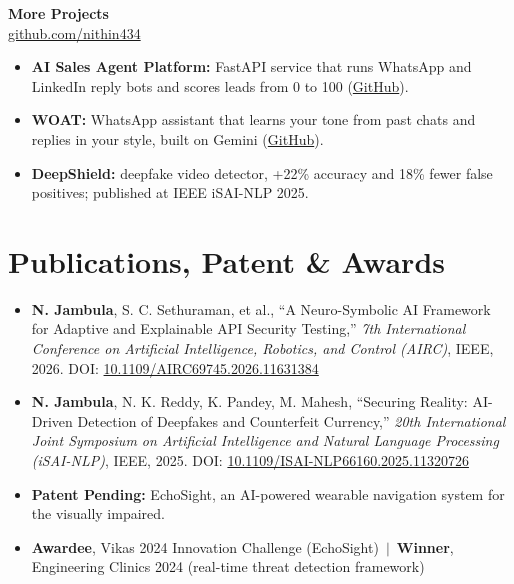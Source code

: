 \documentclass[a4paper,10pt]{article}
\newcommand{\project}[3]{\textbf{#1}\hfill #2\\{\small #3}\par\vspace{-2pt}}
\begin{document}
\project{More Projects}{}{\href{https://github.com/nithin434}{github.com/nithin434}}
\begin{itemize}
  \item \textbf{AI Sales Agent Platform:} FastAPI service that runs WhatsApp and LinkedIn reply bots and scores leads from 0 to 100 (\href{https://github.com/nithin434/sales_agent}{GitHub}).
  \item \textbf{WOAT:} WhatsApp assistant that learns your tone from past chats and replies in your style, built on Gemini (\href{https://github.com/nithin434/woat}{GitHub}).
  \item \textbf{DeepShield:} deepfake video detector, +22\% accuracy and 18\% fewer false positives; published at IEEE iSAI-NLP 2025.
\end{itemize}

\section{Publications, Patent \& Awards}
\begin{itemize}
  \item \textbf{N. Jambula}, S. C. Sethuraman, et al., ``A Neuro-Symbolic AI Framework for Adaptive and Explainable API Security Testing,'' \textit{7th International Conference on Artificial Intelligence, Robotics, and Control (AIRC)}, IEEE, 2026.
        DOI: \href{https://doi.org/10.1109/AIRC69745.2026.11631384}{10.1109/AIRC69745.2026.11631384}
  \item \textbf{N. Jambula}, N. K. Reddy, K. Pandey, M. Mahesh, ``Securing Reality: AI-Driven Detection of Deepfakes and Counterfeit Currency,'' \textit{20th International Joint Symposium on Artificial Intelligence and Natural Language Processing (iSAI-NLP)}, IEEE, 2025.
        DOI: \href{https://doi.org/10.1109/ISAI-NLP66160.2025.11320726}{10.1109/ISAI-NLP66160.2025.11320726}
  \item \textbf{Patent Pending:} EchoSight, an AI-powered wearable navigation system for the visually impaired.
  \item \textbf{Awardee}, Vikas 2024 Innovation Challenge (EchoSight) \,$|$\, \textbf{Winner}, Engineering Clinics 2024 (real-time threat detection framework)
\end{itemize}

\end{document}
